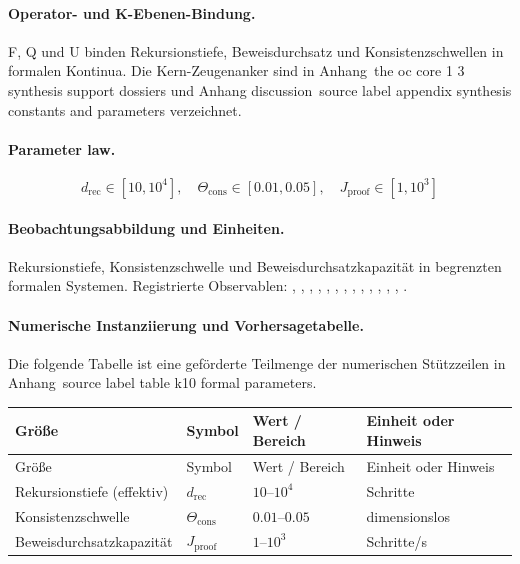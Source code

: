 \paragraph{Operator- und K-Ebenen-Bindung.}
F, Q und U binden Rekursionstiefe, Beweisdurchsatz und Konsistenzschwellen in formalen Kontinua.
Die Kern-Zeugenanker sind in Anhang~the oc core 1 3 synthesis support dossiers und Anhang discussion~source label appendix synthesis constants and parameters verzeichnet.

\paragraph{Parameter law.}
\[
d_{\mathrm{rec}} \in [10,10^4],\quad \Theta_{\mathrm{cons}} \in [0.01,0.05],\quad J_{\mathrm{proof}} \in [1,10^3]
\]

\paragraph{Beobachtungsabbildung und Einheiten.}
Rekursionstiefe, Konsistenzschwelle und Beweisdurchsatzkapazität in begrenzten formalen Systemen.
Registrierte Observablen: , \allowbreak {}, \allowbreak {}, \allowbreak {}, \allowbreak {}, \allowbreak {}, \allowbreak {}, \allowbreak {}, \allowbreak {}, \allowbreak {}, \allowbreak {}, \allowbreak {}, \allowbreak {}, \allowbreak {}.

\paragraph{Numerische Instanziierung und Vorhersagetabelle.}
Die folgende Tabelle ist eine geförderte Teilmenge der numerischen Stützzeilen in Anhang~source label table k10 formal parameters.
\begin{longtable}{@{}L{0.27\textwidth}L{0.15\textwidth}L{0.24\textwidth}L{0.16\textwidth}@{}}
\toprule
Größe & Symbol & Wert / Bereich & Einheit oder Hinweis \\
\midrule
\endfirsthead
\toprule
Größe & Symbol & Wert / Bereich & Einheit oder Hinweis \\
\midrule
\endhead
Rekursionstiefe (effektiv) & $\scriptstyle d_{\mathrm{rec}}$ & $10\text{--}10^4$ & Schritte \\
Konsistenzschwelle & $\scriptstyle \Theta_{\mathrm{cons}}$ & $0.01\text{--}0.05$ & dimensionslos \\
Beweisdurchsatzkapazität & $\scriptstyle J_{\mathrm{proof}}$ & $1\text{--}10^3$ & Schritte/s \\
\bottomrule
\end{longtable}

